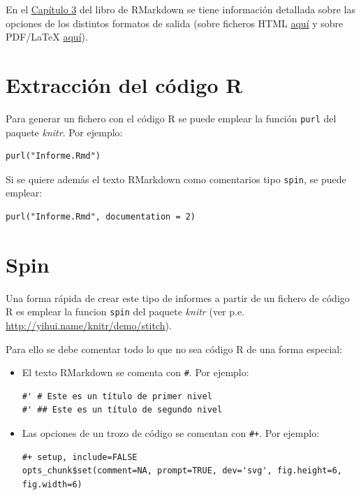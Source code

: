 \documentclass[]{book}
\theoremstyle{definition}
\theoremstyle{definition}
\theoremstyle{definition}
\theoremstyle{remark}
\begin{document}
En el
\href{https://bookdown.org/yihui/rmarkdown/documents.html}{Capítulo 3}
del libro de RMarkdown se tiene información detallada sobre las opciones
de los distintos formatos de salida (sobre ficheros HTML
\href{https://bookdown.org/yihui/rmarkdown/html-document.html}{aquí} y
sobre PDF/LaTeX
\href{https://bookdown.org/yihui/rmarkdown/pdf-document.html}{aquí}).

\section{Extracción del código R}\label{extraccion-del-codigo-r}

Para generar un fichero con el código R se puede emplear la función
\texttt{purl} del paquete \emph{knitr}. Por ejemplo:

\begin{verbatim}
purl("Informe.Rmd")
\end{verbatim}

Si se quiere además el texto RMarkdown como comentarios tipo
\texttt{spin}, se puede emplear:

\begin{verbatim}
purl("Informe.Rmd", documentation = 2)
\end{verbatim}

\section{Spin}\label{spin}

Una forma rápida de crear este tipo de informes a partir de un fichero
de código R es emplear la funcion \texttt{spin} del paquete \emph{knitr}
(ver p.e. \url{http://yihui.name/knitr/demo/stitch}).

Para ello se debe comentar todo lo que no sea código R de una forma
especial:

\begin{itemize}
\item
  El texto RMarkdown se comenta con \texttt{\#\textquotesingle{}}. Por
  ejemplo:

\begin{verbatim}
#' # Este es un título de primer nivel
#' ## Este es un título de segundo nivel
\end{verbatim}
\item
  Las opciones de un trozo de código se comentan con \texttt{\#+}. Por
  ejemplo:

\begin{verbatim}
#+ setup, include=FALSE
opts_chunk$set(comment=NA, prompt=TRUE, dev='svg', fig.height=6, fig.width=6)
\end{verbatim}
\end{itemize}
\end{document}
